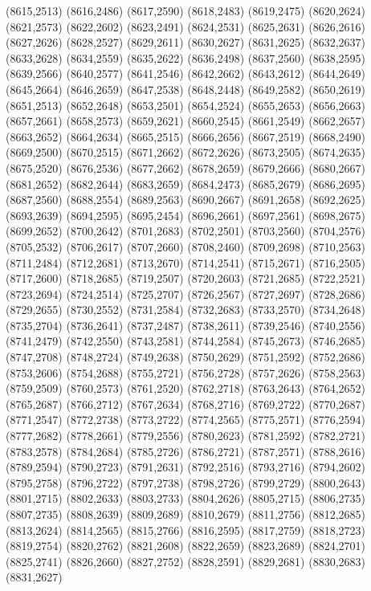(8615,2513)
(8616,2486)
(8617,2590)
(8618,2483)
(8619,2475)
(8620,2624)
(8621,2573)
(8622,2602)
(8623,2491)
(8624,2531)
(8625,2631)
(8626,2616)
(8627,2626)
(8628,2527)
(8629,2611)
(8630,2627)
(8631,2625)
(8632,2637)
(8633,2628)
(8634,2559)
(8635,2622)
(8636,2498)
(8637,2560)
(8638,2595)
(8639,2566)
(8640,2577)
(8641,2546)
(8642,2662)
(8643,2612)
(8644,2649)
(8645,2664)
(8646,2659)
(8647,2538)
(8648,2448)
(8649,2582)
(8650,2619)
(8651,2513)
(8652,2648)
(8653,2501)
(8654,2524)
(8655,2653)
(8656,2663)
(8657,2661)
(8658,2573)
(8659,2621)
(8660,2545)
(8661,2549)
(8662,2657)
(8663,2652)
(8664,2634)
(8665,2515)
(8666,2656)
(8667,2519)
(8668,2490)
(8669,2500)
(8670,2515)
(8671,2662)
(8672,2626)
(8673,2505)
(8674,2635)
(8675,2520)
(8676,2536)
(8677,2662)
(8678,2659)
(8679,2666)
(8680,2667)
(8681,2652)
(8682,2644)
(8683,2659)
(8684,2473)
(8685,2679)
(8686,2695)
(8687,2560)
(8688,2554)
(8689,2563)
(8690,2667)
(8691,2658)
(8692,2625)
(8693,2639)
(8694,2595)
(8695,2454)
(8696,2661)
(8697,2561)
(8698,2675)
(8699,2652)
(8700,2642)
(8701,2683)
(8702,2501)
(8703,2560)
(8704,2576)
(8705,2532)
(8706,2617)
(8707,2660)
(8708,2460)
(8709,2698)
(8710,2563)
(8711,2484)
(8712,2681)
(8713,2670)
(8714,2541)
(8715,2671)
(8716,2505)
(8717,2600)
(8718,2685)
(8719,2507)
(8720,2603)
(8721,2685)
(8722,2521)
(8723,2694)
(8724,2514)
(8725,2707)
(8726,2567)
(8727,2697)
(8728,2686)
(8729,2655)
(8730,2552)
(8731,2584)
(8732,2683)
(8733,2570)
(8734,2648)
(8735,2704)
(8736,2641)
(8737,2487)
(8738,2611)
(8739,2546)
(8740,2556)
(8741,2479)
(8742,2550)
(8743,2581)
(8744,2584)
(8745,2673)
(8746,2685)
(8747,2708)
(8748,2724)
(8749,2638)
(8750,2629)
(8751,2592)
(8752,2686)
(8753,2606)
(8754,2688)
(8755,2721)
(8756,2728)
(8757,2626)
(8758,2563)
(8759,2509)
(8760,2573)
(8761,2520)
(8762,2718)
(8763,2643)
(8764,2652)
(8765,2687)
(8766,2712)
(8767,2634)
(8768,2716)
(8769,2722)
(8770,2687)
(8771,2547)
(8772,2738)
(8773,2722)
(8774,2565)
(8775,2571)
(8776,2594)
(8777,2682)
(8778,2661)
(8779,2556)
(8780,2623)
(8781,2592)
(8782,2721)
(8783,2578)
(8784,2684)
(8785,2726)
(8786,2721)
(8787,2571)
(8788,2616)
(8789,2594)
(8790,2723)
(8791,2631)
(8792,2516)
(8793,2716)
(8794,2602)
(8795,2758)
(8796,2722)
(8797,2738)
(8798,2726)
(8799,2729)
(8800,2643)
(8801,2715)
(8802,2633)
(8803,2733)
(8804,2626)
(8805,2715)
(8806,2735)
(8807,2735)
(8808,2639)
(8809,2689)
(8810,2679)
(8811,2756)
(8812,2685)
(8813,2624)
(8814,2565)
(8815,2766)
(8816,2595)
(8817,2759)
(8818,2723)
(8819,2754)
(8820,2762)
(8821,2608)
(8822,2659)
(8823,2689)
(8824,2701)
(8825,2741)
(8826,2660)
(8827,2752)
(8828,2591)
(8829,2681)
(8830,2683)
(8831,2627)
